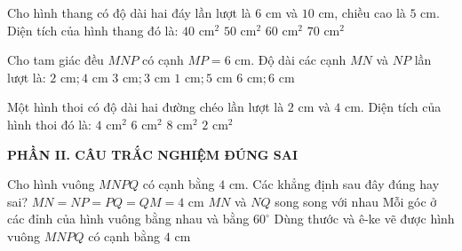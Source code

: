 \documentclass[12pt,a4paper]{article}
\begin{document}
\begin{ex}
Cho hình thang có độ dài hai đáy lần lượt là $6\text{ cm}$ và $10\text{ cm}$, chiều cao là $5\text{ cm}$. Diện tích của hình thang đó là:
\choice
{\True $40\text{ cm}^2$}
{$50\text{ cm}^2$}
{$60\text{ cm}^2$}
{$70\text{ cm}^2$}
\end{ex}

\begin{ex}
Cho tam giác đều $MNP$ có cạnh $MP = 6\text{ cm}$. Độ dài các cạnh $MN$ và $NP$ lần lượt là:
\choice
{$2\text{ cm}; 4\text{ cm}$}
{$3\text{ cm}; 3\text{ cm}$}
{$1\text{ cm}; 5\text{ cm}$}
{\True $6\text{ cm}; 6\text{ cm}$}
\end{ex}

\begin{ex}
Một hình thoi có độ dài hai đường chéo lần lượt là $2\text{ cm}$ và $4\text{ cm}$. Diện tích của hình thoi đó là:
\choice
{\True $4\text{ cm}^2$}
{$6\text{ cm}^2$}
{$8\text{ cm}^2$}
{$2\text{ cm}^2$}
\end{ex}


\setcounter{ex}{0}
\noindent\textbf{\large PHẦN II. CÂU TRẮC NGHIỆM ĐÚNG SAI}
\vspace{1mm}
\begin{ex}
Cho hình vuông $MNPQ$ có cạnh bằng $4\text{ cm}$. Các khẳng định sau đây đúng hay sai?
\choiceTF
{\True $MN = NP = PQ = QM = 4\text{ cm}$}
{$MN$ và $NQ$ song song với nhau}
{Mỗi góc ở các đỉnh của hình vuông bằng nhau và bằng $60^\circ$}
{\True Dùng thước và ê-ke vẽ được hình vuông $MNPQ$ có cạnh bằng $4\text{ cm}$}
\end{ex}
\end{document}
